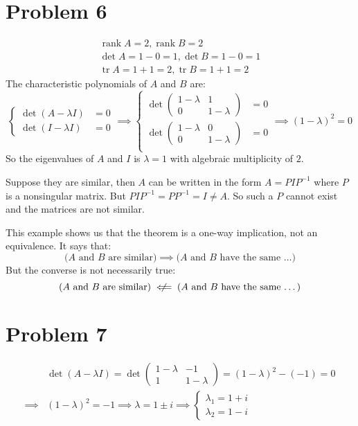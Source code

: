 \documentclass{article}
\newcommand*{\problem}[1]{\section*{Problem #1}}
\DeclareMathOperator{\rank}{rank}
\DeclareMathOperator{\trace}{tr}
\begin{document}
\problem{6}
\begin{gather*}
    \rank A=2,\rank B=2 \\
	\det A=1-0=1, \det B=1-0=1 \\
	\trace A=1+1=2, \trace B=1+1=2
\end{gather*}
The characteristic polynomials of $A$ and $B$ are:
\begin{equation*}
	\left\{ \begin{aligned}
			\det(A-\lambda I)&=0 \\
			\det(I-\lambda I)&=0
	\end{aligned}\right.
	\implies
	\left\{ \begin{aligned}
			\det \begin{pmatrix}
				1-\lambda & 1 \\
				0 & 1-\lambda
			\end{pmatrix}&=0 \\
			\det \begin{pmatrix}
				1-\lambda & 0 \\
				0 & 1-\lambda
			\end{pmatrix}&=0 \\
	\end{aligned}\right.
	\implies \boxed{(1-\lambda)^2=0}
\end{equation*}
So the eigenvalues of $A$ and $I$ is $\lambda=1$ with algebraic multiplicity of $2$.

Suppose they are similar, then $A$ can be written in the form $A=PIP^{-1}$ where $P$ is a nonsingular matrix. But $PIP^{-1}=PP^{-1}=I\neq A$. So such a $P$ cannot exist and the matrices are not similar.

This example shows us that the theorem is a one-way implication, not an equivalence. It says that:
\begin{equation*}
	\text{($A$ and $B$ are similar)} \implies \text{($A$ and $B$ have the same \ldots)}
\end{equation*}
But the converse is not necessarily true:
\begin{equation*}
	\text{($A$ and $B$ are similar)} \centernot\impliedby \text{($A$ and $B$ have the same \ldots)}
\end{equation*}

\problem{7}
\begin{align*}
	&\det(A-\lambda I)
	=\det \begin{pmatrix}
		1-\lambda & -1 \\
		1 & 1-\lambda
	\end{pmatrix}
	=(1-\lambda)^2-(-1)
	=0 \\
	\implies{}& (1-\lambda)^2=-1
	\implies \lambda = 1\pm i
	\implies \begin{cases}
	    \lambda_1=1+i \\
		\lambda_2=1-i
	\end{cases}
\end{align*}
\end{document}
